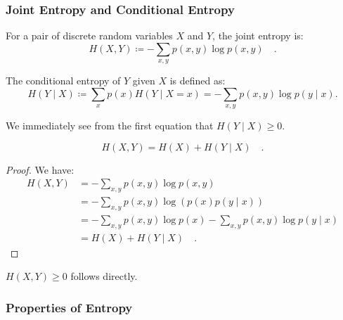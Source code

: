 \documentclass[../../main.tex]{subfiles}
\begin{document}
\subsubsection{Joint Entropy and Conditional Entropy}

\begin{definition}
    For a pair of discrete random variables \( X \) and \( Y \), the joint entropy is:
    \[
        H(X, Y) \coloneqq -\sum_{x,y} p(x, y) \log p(x, y) \quad .
    \]
\end{definition}

\begin{definition}
    The conditional entropy of \( Y \) given \( X \) is defined as:
    \[
        H(Y \mid X) \coloneqq \sum_{x} p(x) H(Y \mid X = x) = -\sum_{x, y} p(x, y) \log p(y \mid x).
    \]
\end{definition}

\begin{corollary}
    We immediately see from the first equation that $H(Y \mid X) \geq 0$.
\end{corollary}

\begin{theorem}
    \[
        H(X, Y) = H(X) + H(Y \mid X) \quad .
    \]
\end{theorem}
\vspace{-2.5em}
\begin{proof}
    We have:
    \begin{align*}
        H(X, Y) &= - \sum_{x,y} p(x, y) \log p(x, y) \\
        &= - \sum_{x,y} p(x, y) \log \left(p(x) p(y \mid x) \right) \\
        &= - \sum_{x,y} p(x, y) \log p(x) - \sum_{x,y} p(x, y) \log p(y \mid x) \\
        &= H(X) + H(Y \mid X) \quad .
    \end{align*}
\end{proof}

\begin{corollary}
    $H(X, Y) \geq 0$ follows directly.
\end{corollary}

\bigskip
\subsubsection{Properties of Entropy}
\end{document}
